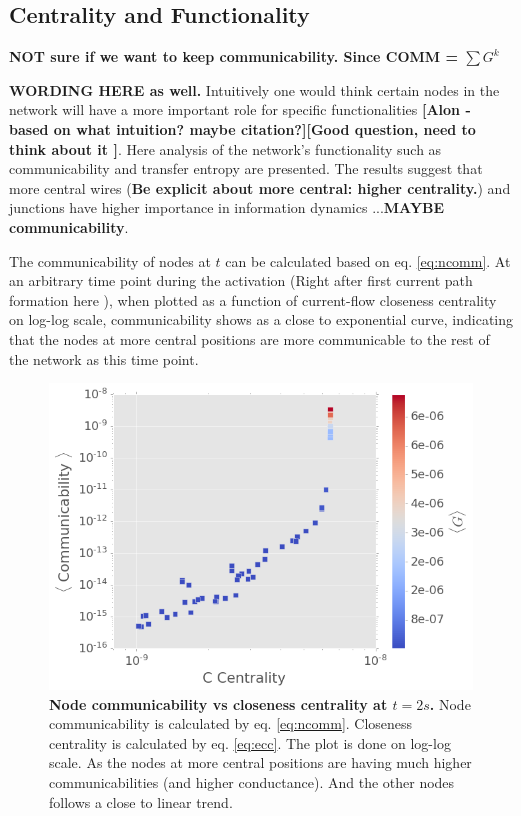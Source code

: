 \documentclass[fleqn,10pt,  amsmath,amssymb,aps]{wlscirep}
\begin{document}


\subsection*{Centrality and Functionality}

\textbf{NOT sure if we want to keep communicability. Since COMM = $\sum G^k$}

\textbf{WORDING HERE as well.} Intuitively one would think certain nodes in the network will have a more important role for specific functionalities \textbf{[Alon - based on what intuition? maybe citation?][Good question, need to think about it ]}. Here analysis of the network's functionality such as communicability and transfer entropy are presented. The results suggest that more central wires (\textbf{Be explicit about more central: higher centrality.}) and junctions have higher importance in information dynamics ...\textbf{MAYBE communicability}.  

The communicability of nodes at $t$ can be calculated based on eq. \ref{eq:ncomm}. At an arbitrary time point during the activation (Right after first current path formation here ), when plotted as a function of current-flow closeness centrality on log-log scale, communicability shows as a close to exponential curve, indicating that the nodes at more central positions are more communicable to the rest of the network as this time point. 

\begin{figure}[h]
	\centering
	\includegraphics[width=0.5\linewidth]{figure/comm_cent}
	\caption{\textbf{Node communicability vs closeness centrality at $t = 2 s$.} Node communicability is calculated by eq. \ref{eq:ncomm}. Closeness centrality is calculated by eq. \ref{eq:ecc}. The plot is done on log-log scale. As the nodes at more central positions are having much higher communicabilities (and higher conductance). And the other nodes follows a close to linear trend.}
	\label{fig:comm_cent}
\end{figure}
\end{document}
